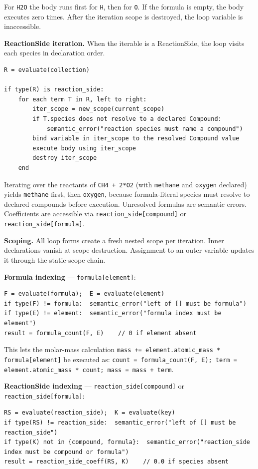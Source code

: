 \documentclass[11pt,a4paper]{article}
\newcommand{\code}[1]{\texttt{#1}}
\begin{document}
For \code{H2O} the body runs first for \code{H}, then for \code{O}. If the formula is empty, the body executes zero times. After the iteration scope is destroyed, the loop variable is inaccessible.

\textbf{ReactionSide iteration.}\; When the iterable is a ReactionSide, the loop visits each species in declaration order.

\begin{lstlisting}[style=sem]
R = evaluate(collection)

if type(R) is reaction_side:
    for each term T in R, left to right:
        iter_scope = new_scope(current_scope)
        if T.species does not resolve to a declared Compound:
            semantic_error("reaction species must name a compound")
        bind variable in iter_scope to the resolved Compound value
        execute body using iter_scope
        destroy iter_scope
    end
\end{lstlisting}

Iterating over the reactants of \code{CH4 + 2*O2} (with \code{methane} and \code{oxygen} declared) yields \code{methane} first, then \code{oxygen}, because formula-literal species must resolve to declared compounds before execution. Unresolved formulas are semantic errors. Coefficients are accessible via \code{reaction\_side[compound]} or \code{reaction\_side[formula]}.

\textbf{Scoping.}\; All loop forms create a fresh nested scope per iteration. Inner declarations vanish at scope destruction. Assignment to an outer variable updates it through the static-scope chain.

\textbf{Formula indexing} --- \code{formula[element]}:

\begin{lstlisting}[style=sem]
F = evaluate(formula);  E = evaluate(element)
if type(F) != formula:  semantic_error("left of [] must be formula")
if type(E) != element:  semantic_error("formula index must be element")
result = formula_count(F, E)    // 0 if element absent
\end{lstlisting}

This lets the molar-mass calculation \code{mass += element.atomic\_mass * formula[element]} be executed as: \texttt{count = formula\_count(F, E);\ term = element.atomic\_mass * count;\ mass = mass + term}.

\textbf{ReactionSide indexing} --- \code{reaction\_side[compound]} or \code{reaction\_side[formula]}:

\begin{lstlisting}[style=sem]
RS = evaluate(reaction_side);  K = evaluate(key)
if type(RS) != reaction_side:  semantic_error("left of [] must be reaction_side")
if type(K) not in {compound, formula}:  semantic_error("reaction_side index must be compound or formula")
result = reaction_side_coeff(RS, K)    // 0.0 if species absent
\end{lstlisting}
\end{document}
